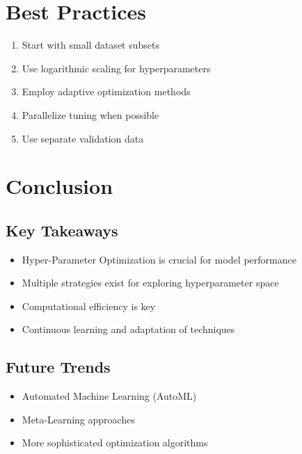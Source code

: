 \documentclass[
  letterpaper,
  DIV=11,
  numbers=noendperiod]{scrreprt}
\providecommand{\tightlist}{%
  \setlength{\itemsep}{0pt}\setlength{\parskip}{0pt}}\usepackage{longtable,booktabs,array}
\begin{document}
\section{Best Practices}\label{best-practices}

\begin{enumerate}
\def\labelenumi{\arabic{enumi}.}
\tightlist
\item
  Start with small dataset subsets
\item
  Use logarithmic scaling for hyperparameters
\item
  Employ adaptive optimization methods
\item
  Parallelize tuning when possible
\item
  Use separate validation data
\end{enumerate}

\section{Conclusion}\label{conclusion-9}

\subsection{Key Takeaways}\label{key-takeaways-1}

\begin{itemize}
\tightlist
\item
  Hyper-Parameter Optimization is crucial for model performance
\item
  Multiple strategies exist for exploring hyperparameter space
\item
  Computational efficiency is key
\item
  Continuous learning and adaptation of techniques
\end{itemize}

\subsection{Future Trends}\label{future-trends}

\begin{itemize}
\tightlist
\item
  Automated Machine Learning (AutoML)
\item
  Meta-Learning approaches
\item
  More sophisticated optimization algorithms
\end{itemize}

\end{document}

